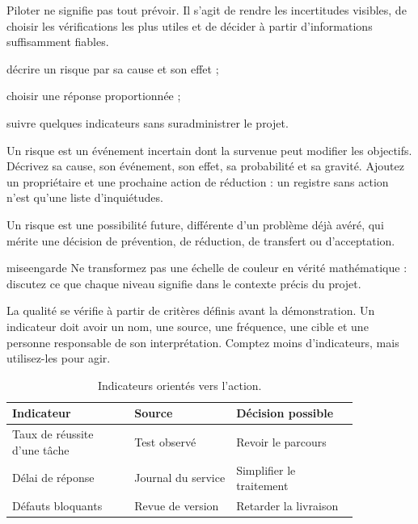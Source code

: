 \documentclass[12pt,twoside]{upbcours}
\begin{document}
\introduction
\begin{survol}
  Piloter ne signifie pas tout prévoir. Il s'agit de rendre les incertitudes visibles, de choisir
  les vérifications les plus utiles et de décider à partir d'informations suffisamment fiables.
\end{survol}
\begin{objectifs}
  \item décrire un risque par sa cause et son effet ;
  \item choisir une réponse proportionnée ;
  \item suivre quelques indicateurs sans suradministrer le projet.
\end{objectifs}
Un risque est un événement incertain dont la survenue peut modifier les objectifs. Décrivez sa cause,
son événement, son effet, sa probabilité et sa gravité. Ajoutez un propriétaire et une prochaine
action de réduction : un registre sans action n'est qu'une liste d'inquiétudes.
\begin{definition}[Risque]
  Un risque est une possibilité future, différente d'un problème déjà avéré, qui mérite une décision
  de prévention, de réduction, de transfert ou d'acceptation.
\end{definition}
\begin{icone}{miseengarde}
  Ne transformez pas une échelle de couleur en vérité mathématique : discutez ce que chaque niveau
  signifie dans le contexte précis du projet.
\end{icone}
La qualité se vérifie à partir de critères définis avant la démonstration. Un indicateur doit avoir
un nom, une source, une fréquence, une cible et une personne responsable de son interprétation.
Comptez moins d'indicateurs, mais utilisez-les pour agir.
\begin{table}[ht]
  \centering
  \begin{tabular}{p{0.3\linewidth}p{0.25\linewidth}p{0.3\linewidth}}
    \toprule
    Indicateur & Source & Décision possible\\
    \midrule
    Taux de réussite d'une tâche & Test observé & Revoir le parcours\\
    Délai de réponse & Journal du service & Simplifier le traitement\\
    Défauts bloquants & Revue de version & Retarder la livraison\\
    \bottomrule
  \end{tabular}
  \caption{Indicateurs orientés vers l'action.}
\end{table}
\end{document}
